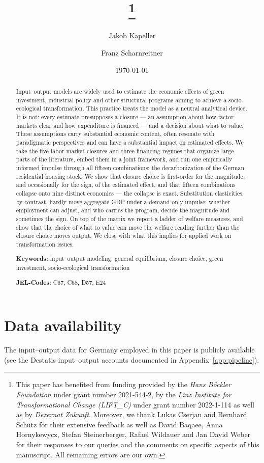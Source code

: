 \documentclass{article}
\title{\papertitle\thanks{This paper has benefited from funding provided by the \textit{Hans B\"ockler Foundation} under grant number 2021-544-2, by the \textit{Linz Institute for Transformational Change (LIFT\_C)} under grant number 2022-1-114 as well as by \textit{Dezernat Zukunft}. Moreover, we thank Lukas Cserjan and Bernhard Sch\"utz for their extensive feedback as well as David Baqaee, Anna Hornykewycz, Stefan Steinerberger, Rafael Wildauer and Jan David Weber for their responses to our queries and the comments on specific aspects of this manuscript. All remaining errors are our own.}}
\author[1]{Jakob Kapeller}
\author[2]{Franz Scharnreitner}
\affil[1]{\small{Corresponding author, Institute for Socio-Economics, University of Duisburg-Essen and \linebreak Institute for Comprehensive Analysis of the Economy (ICAE), Johannes Kepler University Linz, \href{mailto:jakob.kapeller@uni-due.de}{jakob.kapeller@uni-due.de}}}
\affil[2]{\small{Institute for Comprehensive Analysis of the Economy (ICAE), Johannes Kepler University Linz}}
\date{\today}
\begin{document}
\maketitle

\begin{abstract}
Input–output models are widely used to estimate the economic effects of green investment, industrial policy and other structural programs aiming to achieve a socio-ecological transformation. This practice treats the model as a neutral analytical device. It is not: every estimate presupposes a closure — an assumption about how factor markets clear and how expenditure is financed — and a decision about what to value. These assumptions carry substantial economic content, often resonate with paradigmatic perspectives and can have a substantial impact on estimated effects. We take the five labor-market closures and three financing regimes that organize large parts of the literature, embed them in a joint framework, and run one empirically informed impulse through all fifteen combinations: the decarbonization of the German residential housing stock. We show that closure choice is first-order for the magnitude, and occasionally for the sign, of the estimated effect, and that fifteen combinations collapse onto nine distinct economies --- the
collapse is exact. Substitution elasticities, by contrast, hardly move aggregate GDP under a
demand-only impulse: whether employment can adjust, and who carries the program,
decide the magnitude and sometimes the sign. On top of the matrix we report a ladder of welfare measures, and show that the choice of what to value can move the welfare reading further than the closure choice moves output. We close with what this implies for applied work on transformation issues.

\textbf{Keywords:} input--output modeling, general equilibrium, closure choice, green investment, socio-ecological transformation

\textbf{JEL-Codes:} C67, C68, D57, E24
\end{abstract}

\newpage










\section*{Data availability}
The input--output data for Germany employed in this paper is publicly available
(see the Destatis input--output accounts documented in Appendix~\ref{app:pipeline}).
\end{document}
